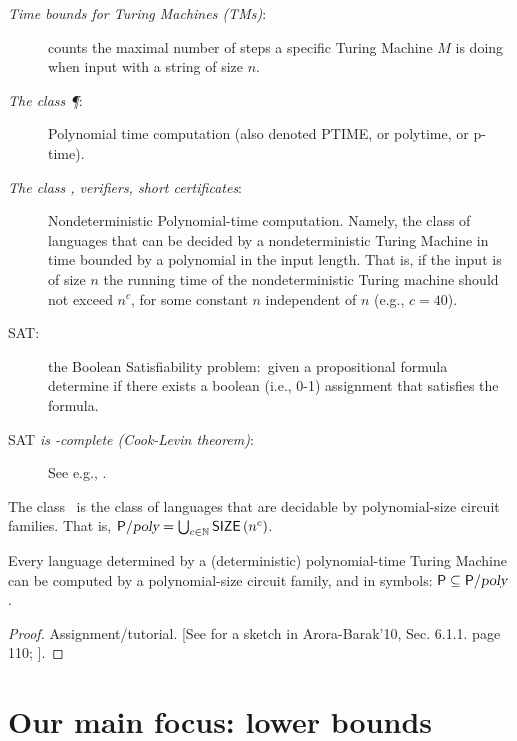 \begin{description}
\item[\textit{Time bounds for Turing Machines (TMs)}:] counts the maximal number of steps a specific Turing Machine $M$ is doing when input with a string of  size $n$. 

\item[\textit{The class \P}:]  Polynomial time computation (also denoted  PTIME, or polytime, or p-time).

\item[\textit{The class \NP, verifiers, short certificates}:] Nondeterministic Polynomial-time computation. Namely, the class of languages that can be decided by a nondeterministic Turing Machine in time bounded by a polynomial in the input length.  That is, if the input is of size $n$ the running time of the nondeterministic Turing machine should not exceed $n^c$, for some constant $n$ independent of $n$ (e.g.,  $c=40$). 

\item[SAT:] the Boolean Satisfiability problem:\ given a propositional formula determine if there exists a boolean (i.e., 0-1) assignment that satisfies the formula. 

\item[SAT \textit{is \NP-complete (Cook-Levin theorem)}:] See e.g., \cite{AB09,Pap94}.
\end{description}






\begin{definition} The class \Ppoly~is the class of languages that are decidable by polynomial-size circuit families.
That is, ${\mathsf{P}}/{\textsl{poly}}=\bigcup_{c \in \mathbb{N}} \operatorname{{\mathsf{SIZE}}}\left(n^c\right)$.
\end{definition}


\begin{theorem} Every language determined by a (deterministic) polynomial-time Turing Machine can be computed by a polynomial-size circuit  family, and in symbols: 
${\mathsf{P}} \subseteq {\ensuremath{\mathsf{P}}}/{\textsl{poly}}$.
\end{theorem}

\begin{proof}
Assignment/tutorial.
[See for a sketch in Arora-Barak'10, Sec. 6.1.1. page 110; \cite{AB09}]. \end{proof}

\section{Our main focus: lower bounds}


